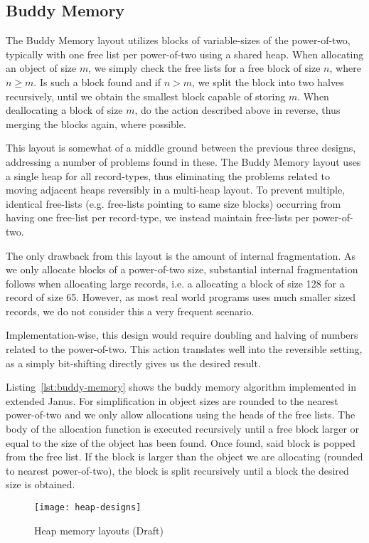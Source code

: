 
\subsection{Buddy Memory}
\label{subsec:buddy-memory}
The Buddy Memory layout utilizes blocks of variable-sizes of the power-of-two, typically with one free list per power-of-two using a shared heap. When allocating an object of size $m$, we simply check the free lists for a free block of size $n$, where $n \geq m$. Is such a block found and if $n > m$, we split the block into two halves recursively, until we obtain the smallest block capable of storing $m$. When deallocating a block of size $m$, do the action described above in reverse, thus merging the blocks again, where possible.

This layout is somewhat of a middle ground between the previous three designs, addressing a number of problems found in these. The Buddy Memory layout uses a single heap for all record-types, thus eliminating the problems related to moving adjacent heaps reversibly in a multi-heap layout. To prevent multiple, identical free-lists (e.g. free-lists pointing to same size blocks) occurring from having one free-list per record-type, we instead maintain free-lists per power-of-two.

The only drawback from this layout is the amount of internal fragmentation. As we only allocate blocks of a power-of-two size, substantial internal fragmentation follows when allocating large records, i.e. a allocating a block of size 128 for a record of size 65. However, as most real world programs uses much smaller sized records, we do not consider this a very frequent scenario.

Implementation-wise, this design would require doubling and halving of numbers related to the power-of-two. This action translates well into the reversible setting, as a simply bit-shifting directly gives us the desired result.



Listing~\ref{lst:buddy-memory} shows the buddy memory algorithm implemented in extended Janus. For simplification in object sizes are rounded to the nearest power-of-two and we only allow allocations using the heads of the free lists.
The body of the allocation function is executed recursively until a free block larger or equal to the size of the object has been found. Once found, said block is popped from the free list. If the block is larger than the object we are allocating (rounded to nearest power-of-two), the block is split recursively until a block the desired size is obtained.



\begin{figure}[H]
  \centering
  \texttt{[image: heap-designs]}
  \caption{Heap memory layouts (Draft)}
\end{figure}

